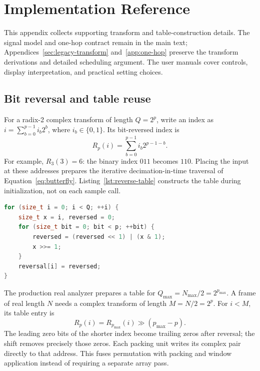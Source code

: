 \section{Implementation Reference}
\label{app:implementation}
This appendix collects supporting transform and table-construction
details. The signal model and one-hop contract
remain in the main text;
Appendices~\ref{sec:legacy-transform} and~\ref{app:one-hop} preserve the
transform derivations and detailed scheduling argument. The user manuals
cover controls, display interpretation, and practical setting choices.

\subsection{Bit reversal and table reuse}
For a radix-2 complex transform of length $Q=2^p$, write an index as
$i=\sum_{b=0}^{p-1}i_b2^b$, where $i_b\in\{0,1\}$. Its bit-reversed index is
\begin{equation}
 R_p(i)=\sum_{b=0}^{p-1}i_b2^{p-1-b}.
 \label{eq:reverse-index}
\end{equation}
For example, $R_3(3)=6$: the binary index $011$ becomes $110$. Placing the
input at these addresses prepares the iterative decimation-in-time traversal
of Equation~\eqref{eq:butterfly}. Listing~\ref{lst:reverse-table} constructs
the table during initialization, not on each sample call.

\begin{lstlisting}[float=tbp,language=C++,caption={Reference construction of a bit-reversal table for $Q=2^p$.},label={lst:reverse-table}]
for (size_t i = 0; i < Q; ++i) {
    size_t x = i, reversed = 0;
    for (size_t bit = 0; bit < p; ++bit) {
        reversed = (reversed << 1) | (x & 1);
        x >>= 1;
    }
    reversal[i] = reversed;
}
\end{lstlisting}

The production real analyzer prepares a table for
$Q_{\max}=N_{\max}/2=2^{p_{\max}}$. A frame of real length $N$ needs a
complex transform of length $M=N/2=2^p$. For $i<M$, its table entry is
\begin{equation}
 R_p(i)=R_{p_{\max}}(i)\mathbin{\gg}(p_{\max}-p).
 \label{eq:reverse-reuse}
\end{equation}
The leading zero bits of the shorter index become trailing zeros after
reversal; the shift removes precisely those zeros. Each packing unit writes
its complex pair directly to that address. This fuses permutation with
packing and window application instead of requiring a separate array pass.

